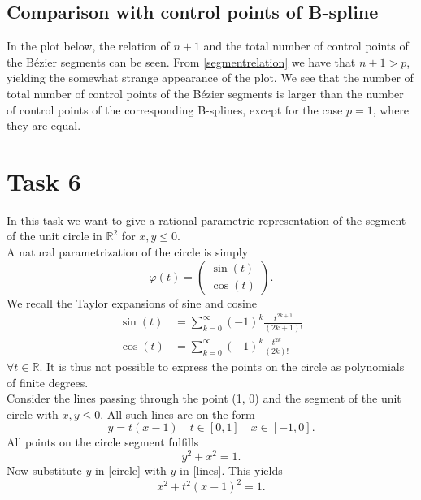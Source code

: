\documentclass[]{article}
\begin{document}
\subsection*{Comparison with control points of B-spline}
In the plot below, the relation of $n+1$ and the total number of control points of the B\'{e}zier segments can be seen. From \eqref{segmentrelation} we have that $n+1>p$, yielding the somewhat strange appearance of the plot. We see that the number of total number of control points of the B\'{e}zier segments is larger than the number of control points of the corresponding B-splines, except for the case $p=1$, where they are equal.

\section*{Task 6}
In this task we want to give a rational parametric representation of the segment of the unit circle in $\mathbb{R}^2$ for $x, y \leq 0$.\\
A natural parametrization of the circle is simply\begin{equation*}
\varphi(t) = \left(\begin{array}{c}
\sin(t)\\
\cos(t)
\end{array}\right).
\end{equation*}
We recall the Taylor expansions of sine and cosine\begin{equation}
\begin{aligned}
\sin(t) &= \sum_{k=0}^{\infty}(-1)^k\frac{t^{2k+1}}{(2k+1)!}\\
\cos(t) &= \sum_{k=0}^{\infty}(-1)^k\frac{t^{2k}}{(2k)!}
\end{aligned}
\end{equation}
$\forall t\in\mathbb{R}$. It is thus not possible to express the points on the circle as polynomials of finite degrees.\\
Consider the lines passing through the point (1, 0) and the segment of the unit circle with $x, y\leq 0$. All such lines are on the form \begin{equation}\label{lines}
y=t(x-1)\quad t\in[0, 1]\quad x\in[-1, 0].
\end{equation}
All points on the circle segment fulfills \begin{equation}\label{circle}
y^2 + x^2 = 1.
\end{equation} 
Now substitute $y$ in \eqref{circle} with $y$ in \eqref{lines}. This yields\begin{equation}\label{xequation}
x^2 + t^2(x - 1)^2 = 1.
\end{equation}
\end{document}
